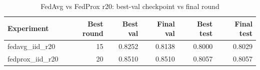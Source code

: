 \begin{table}[t]
\centering
\caption{FedAvg vs FedProx r20: best-val checkpoint vs final round}
\begin{tabular}{lrrrrr}
\toprule
Experiment & Best round & Best val & Final val & Best test & Final test \\
\midrule
fedavg_iid_r20 & 15 & 0.8252 & 0.8138 & 0.8000 & 0.8029 \\
fedprox_iid_r20 & 20 & 0.8510 & 0.8510 & 0.8057 & 0.8057 \\
\bottomrule
\end{tabular}
\end{table}
